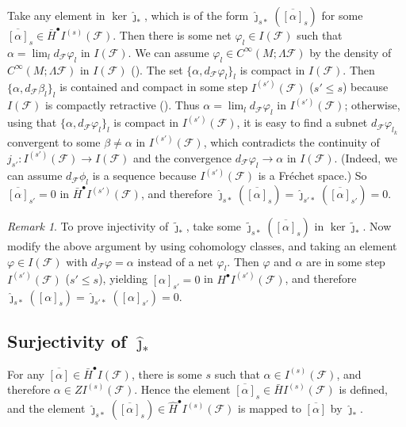 \documentclass{memo-l}
\theoremstyle{plain}
\theoremstyle{definition}
\theoremstyle{remark}
\newtheorem{rem}[thm]{Remark}
\newcommand{\FF}{\mathcal{F}}
\numberwithin{section}{chapter}
\numberwithin{equation}{section}%
\begin{document}
Take any element in $\ker\hat\jmath_*$, which is of the form $\hat\jmath_{s*}(\overline{[\alpha]}_s)$ for some $\overline{[\alpha]}_s\in\bar H^\bullet I^{(s)}(\FF)$. Then there is some net $\varphi_l\in I(\FF)$ such that $\alpha=\lim_ld_\FF\varphi_l$ in $I(\FF)$. We can assume $\varphi_l\in C^\infty(M;\Lambda\FF)$ by the density of $C^\infty(M;\Lambda\FF)$ in $I(\FF)$ (). The set $\{\alpha,d_\FF\varphi_l\}_l$ is compact in $I(\FF)$. Then $\{\alpha,d_\FF\beta_l\}_l$ is contained and compact in some step $I^{(s')}(\FF)$ ($s'\le s$) because $I(\FF)$ is compactly retractive (). Thus $\alpha=\lim_ld_\FF\varphi_l$ in $I^{(s')}(\FF)$; otherwise, using that $\{\alpha,d_\FF\varphi_l\}_l$ is compact in $I^{(s')}(\FF)$, it is easy to find a subnet $d_\FF\varphi_{l_k}$ convergent to some $\beta\ne\alpha$ in $I^{(s')}(\FF)$, which contradicts the continuity of $j_{s'}:I^{(s')}(\FF)\to I(\FF)$ and the convergence $d_\FF\varphi_l\to\alpha$ in $I(\FF)$. (Indeed, we can assume $d_\FF\phi_l$ is a sequence because $I^{(s')}(\FF)$ is a Fr\'echet space.) So $\overline{[\alpha]}_{s'}=0$ in $\bar H^\bullet I^{(s')}(\FF)$, and therefore $\hat\jmath_{s*}(\overline{[\alpha]}_s)=\hat\jmath_{s'*}(\overline{[\alpha]}_{s'})=0$.

\begin{rem}\label{r: injectivity of tilde jmath_*}
To prove injectivity of $\tilde\jmath_*$, take some $\tilde\jmath_{s*}(\overline{[\alpha]}_s)$ in $\ker\tilde\jmath_*$. Now modify the above argument by using cohomology classes, and taking an element $\varphi\in I(\FF)$ with $d_\FF\varphi=\alpha$ instead of a net $\varphi_l$. Then $\varphi$ and $\alpha$ are in some step $I^{(s')}(\FF)$ ($s'\le s$), yielding $[\alpha]_{s'}=0$ in $H^\bullet I^{(s')}(\FF)$, and therefore $\hat\jmath_{s*}([\alpha]_s)=\hat\jmath_{s'*}([\alpha]_{s'})=0$.
\end{rem}


\subsection{Surjectivity of $\hat\jmath_*$}\label{ss: surjectivity of hat jmath_*}

For any $\overline{[\alpha]}\in\bar H^\bullet I(\FF)$, there is some $s$ such that $\alpha\in I^{(s)}(\FF)$, and therefore $\alpha\in ZI^{(s)}(\FF)$. Hence the element $\overline{[\alpha]}_s\in\bar HI^{(s)}(\FF)$ is defined, and the element $\hat\jmath_{s*}(\overline{[\alpha]}_s)\in\widehat H^\bullet I^{(s)}(\FF)$ is mapped to $\overline{[\alpha]}$ by $\hat\jmath_*$.
\end{document}
